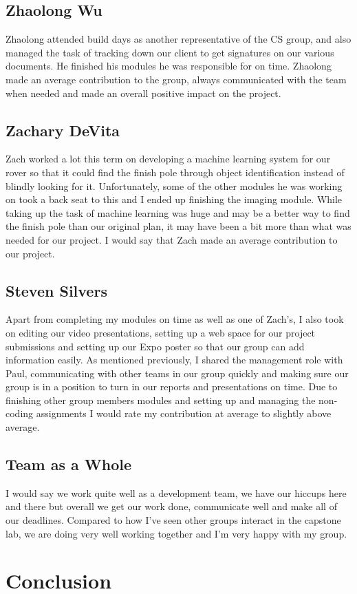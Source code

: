 \documentclass[10pt,letterpaper,onecolumn,draftclsnofoot,journal]{IEEEtran}
\begin{document}
\subsection{Zhaolong Wu}
Zhaolong attended build days as another representative of the CS group, and also managed the task of tracking down our client to get signatures on our various documents. He finished his modules he was responsible for on time. Zhaolong made an average contribution to the group, always communicated with the team when needed and made an overall positive impact on the project.
\subsection{Zachary DeVita}
Zach worked a lot this term on developing a machine learning system for our rover so that it could find the finish pole through object identification instead of blindly looking for it. Unfortunately, some of the other modules he was working on took a back seat to this and I ended up finishing the imaging module. While taking up the task of machine learning was huge and may be a better way to find the finish pole than our original plan, it may have been a bit more than what was needed for our project. I would say that Zach made an average contribution to our project.
\subsection{Steven Silvers}
Apart from completing my modules on time as well as one of Zach's, I also took on editing our video presentations, setting up a web space for our project submissions and setting up our Expo poster so that our group can add information easily. As mentioned previously, I shared the management role with Paul, communicating with other teams in our group quickly and making sure our group is in a position to turn in our reports and presentations on time. Due to finishing other group members modules and setting up and managing the non-coding assignments I would rate my contribution at average to slightly above average.
\subsection{Team as a Whole}
I would say we work quite well as a development team, we have our hiccups here and there but overall we get our work done, communicate well and make all of our deadlines. Compared to how I've seen other groups interact in the capstone lab, we are doing very well working together and I'm very happy with my group.

\section{Conclusion}

\clearpage

\vspace{1in}
\end{document}

